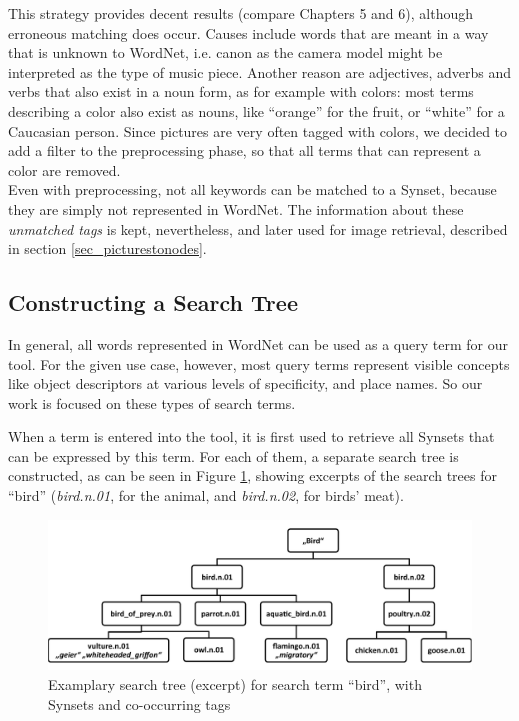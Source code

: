 This strategy provides decent results (compare Chapters 5 and 6), although erroneous matching does occur. Causes include words that are meant in a way that is unknown to WordNet, i.e. canon as the camera model might be interpreted as the type of music piece. Another reason are adjectives, adverbs and verbs that also exist in a noun form, as for example with colors: most terms describing a color also exist as nouns, like ``orange'' for the fruit, or ``white'' for a Caucasian person. Since pictures are very often tagged with colors, we decided to add a filter to the preprocessing phase, so that all terms that can represent a color are removed. \\

Even with preprocessing, not all keywords can be matched to a Synset, because they are simply not represented in WordNet. The information about these \emph{unmatched tags} is kept, nevertheless, and later used for image retrieval, described in section \ref{sec_picturestonodes}.


\subsection{Constructing a Search Tree}
\label{sec_searchtreeconstruction}
In general, all words represented in WordNet can be used as a query term for our tool. For the given use case, however, most query terms represent visible concepts like object descriptors at various levels of specificity, and place names. So our work is focused on these types of search terms.

When a term is entered into the tool, it is first used to retrieve all Synsets that can be expressed by this term. For each of them, a separate search tree is constructed, as can be seen in Figure \ref{fig_searchtree}, showing excerpts of the search trees for ``bird'' (\emph{bird.n.01}, for the animal, and \emph{bird.n.02}, for birds' meat).

\begin{figure}[h]
\includegraphics[width=\textwidth]{images/searchtree.pdf}
\caption{Examplary search tree (excerpt) for search term ``bird'', with Synsets and co-occurring tags}
\label{fig_searchtree}
\end{figure}


